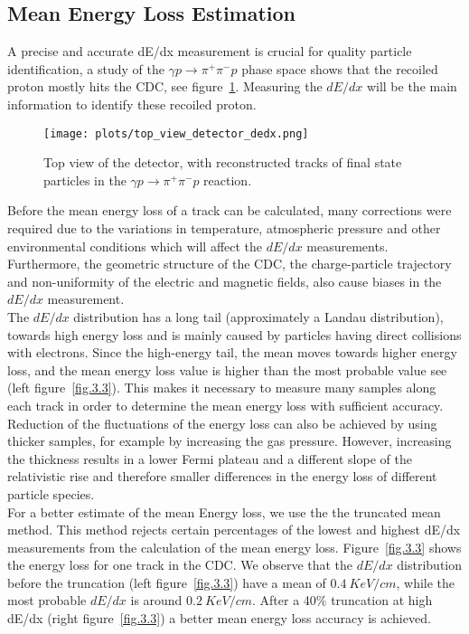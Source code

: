 \subsection{Mean Energy Loss Estimation}
A precise and accurate dE/dx measurement is crucial for quality particle identification, a study of the $\gamma p \rightarrow \pi^{+} \pi^{-} p$ phase space shows that the recoiled proton mostly hits the CDC, see figure~\ref{fig.3.2}.
Measuring the $dE/dx$ will be the main information to identify these recoiled proton.
\begin{figure}[H]
    \centering
    \texttt{[image: plots/top\_view\_detector\_dedx.png]}
    \caption{\label{fig.3.2}Top view of the detector, with reconstructed tracks of final state particles in the $\gamma p \rightarrow \pi^{+} \pi^{-} p$ reaction.}
\end{figure}
Before the mean energy loss of a track can be calculated, many corrections were required due to the variations in temperature, atmospheric pressure and other environmental conditions which will affect the $dE/dx$ measurements. Furthermore, the geometric structure of the CDC, the charge-particle trajectory and non-uniformity of the electric and magnetic fields, also cause biases in the $dE/dx$ measurement.\\
The $dE/dx$ distribution has a long tail (approximately a Landau distribution), towards high energy loss and is mainly caused by particles having direct collisions with electrons. Since the high-energy tail, the mean moves towards higher energy loss, and the mean energy loss value is higher than the most probable value see (left figure~\ref{fig.3.3}). This makes it necessary to measure many samples along each track in order to determine the mean energy loss with sufficient accuracy. Reduction of the fluctuations of the energy loss can also be achieved by using thicker samples, for example by increasing the gas pressure. However, increasing the thickness results in a lower Fermi plateau and a different slope of the relativistic rise and therefore smaller differences in the energy loss of different particle species.\\
For a better estimate of the mean Energy loss, we use the the truncated mean method. This method rejects certain percentages of the lowest and highest dE/dx measurements from the calculation of the mean energy loss. Figure~\ref{fig.3.3} shows the energy loss for one track in the CDC. We observe that the $dE/dx$ distribution before the truncation (left figure~\ref{fig.3.3}) have a mean of $0.4~KeV/cm$, while the most probable $dE/dx$ is around $0.2~KeV/cm$. After a 40$\%$ truncation at high dE/dx (right figure~\ref{fig.3.3}) a better mean energy loss accuracy is achieved.
